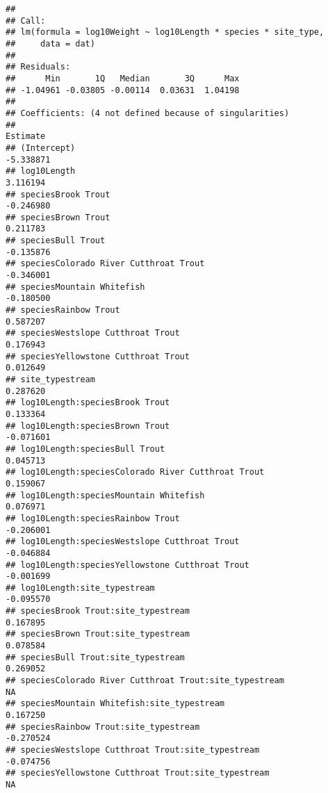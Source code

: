 \documentclass[
  landscape]{article}
\begin{document}
\begin{verbatim}
## 
## Call:
## lm(formula = log10Weight ~ log10Length * species * site_type, 
##     data = dat)
## 
## Residuals:
##      Min       1Q   Median       3Q      Max 
## -1.04961 -0.03805 -0.00114  0.03631  1.04198 
## 
## Coefficients: (4 not defined because of singularities)
##                                                                    Estimate
## (Intercept)                                                       -5.338871
## log10Length                                                        3.116194
## speciesBrook Trout                                                -0.246980
## speciesBrown Trout                                                 0.211783
## speciesBull Trout                                                 -0.135876
## speciesColorado River Cutthroat Trout                             -0.346001
## speciesMountain Whitefish                                         -0.180500
## speciesRainbow Trout                                               0.587207
## speciesWestslope Cutthroat Trout                                   0.176943
## speciesYellowstone Cutthroat Trout                                 0.012649
## site_typestream                                                    0.287620
## log10Length:speciesBrook Trout                                     0.133364
## log10Length:speciesBrown Trout                                    -0.071601
## log10Length:speciesBull Trout                                      0.045713
## log10Length:speciesColorado River Cutthroat Trout                  0.159067
## log10Length:speciesMountain Whitefish                              0.076971
## log10Length:speciesRainbow Trout                                  -0.206001
## log10Length:speciesWestslope Cutthroat Trout                      -0.046884
## log10Length:speciesYellowstone Cutthroat Trout                    -0.001699
## log10Length:site_typestream                                       -0.095570
## speciesBrook Trout:site_typestream                                 0.167895
## speciesBrown Trout:site_typestream                                 0.078584
## speciesBull Trout:site_typestream                                  0.269052
## speciesColorado River Cutthroat Trout:site_typestream                    NA
## speciesMountain Whitefish:site_typestream                          0.167250
## speciesRainbow Trout:site_typestream                              -0.270524
## speciesWestslope Cutthroat Trout:site_typestream                  -0.074756
## speciesYellowstone Cutthroat Trout:site_typestream                       NA

\end{verbatim}
\end{document}

